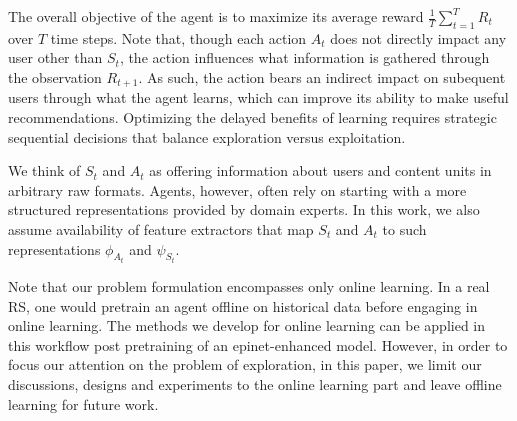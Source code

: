 The overall objective of the agent is to maximize its average reward $\frac{1}{T}\sum^T_{t=1} R_t$ over $T$ time steps. Note that, though each action $A_t$ does not directly impact any user other than $S_t$, the action influences what information is gathered through the observation $R_{t+1}$.  As such, the action bears an indirect impact on subequent users through what the agent learns, which can improve its ability to make useful recommendations. 
 Optimizing the delayed benefits of learning requires strategic sequential decisions that balance exploration versus exploitation.

We think of $S_t$ and $A_t$ as offering information about users and content units in arbitrary raw formats.  Agents, however, often rely on starting with a more structured representations provided by domain experts.  In this work, we also assume availability of feature extractors that map $S_t$ and $A_t$ to such representations $\phi_{A_t}$ and $\psi_{S_t}$.

Note that our problem formulation encompasses only online learning.  In a real RS, one would pretrain an agent offline on historical data before engaging in online learning.  The methods we develop for online learning can be applied in this workflow post pretraining of an epinet-enhanced model.  However, in order to focus our attention on the problem of exploration, in this paper, we limit our discussions, designs and experiments to the online learning part and leave offline learning for future work.